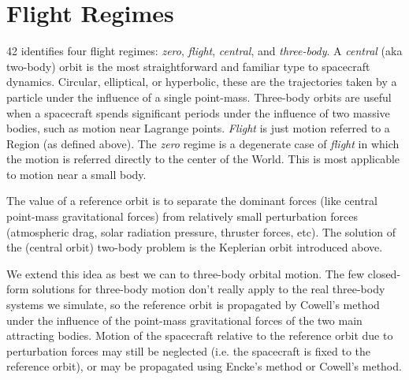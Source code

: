 \documentclass[12pt]{article}
\begin{document}
\section{Flight Regimes}

42 identifies four flight regimes: {\em zero}, {\em flight}, {\em central}, and {\em three-body}.  A {\em central} (aka two-body) orbit is the most straightforward and familiar type to spacecraft dynamics.  Circular, elliptical, or hyperbolic, these are the trajectories taken by a particle under the influence of a single point-mass.  Three-body orbits are useful when a spacecraft spends significant periods under the influence of two massive bodies, such as motion near Lagrange points.  {\em Flight} is just motion referred to a Region (as defined above).  The {\em zero} regime is a degenerate case of {\em flight} in which the motion is referred directly to the center of the World.  This is most applicable to motion near a small body.

The value of a reference orbit is to separate the dominant forces (like central point-mass gravitational forces) from relatively small perturbation forces (atmospheric drag, solar radiation pressure, thruster forces, etc).  The solution of the (central orbit) two-body problem is the Keplerian orbit introduced above.  

We extend this idea as best we can to three-body orbital motion.  The few closed-form solutions for three-body motion don't really apply to the real three-body systems we simulate, so the reference orbit is propagated by Cowell's method under the influence of the point-mass gravitational forces of the two main attracting bodies.  Motion of the spacecraft relative to the reference orbit due to perturbation forces may still be neglected (i.e. the spacecraft is fixed to the reference orbit), or may be propagated using Encke's method or Cowell's method.
\end{document}
